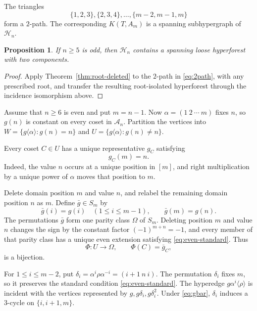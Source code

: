 \documentclass[4pt]{article} %
\newtheorem{proposition}[theorem]{Proposition}
\newcommand{\la}{\langle}
\newcommand{\ra}{\rangle}
\begin{document}
The triangles
\begin{equation}\label{eq:2path}
 \{1,2,3\},\{2,3,4\},\ldots,\{m-2,m-1,m\}
\end{equation}
form a $2$-path. The corresponding $K(T,A_m)$ is a spanning subhypergraph
of $\mathcal H_n$.

\begin{proposition}\label{prop:odd-forest}
If $n\geq5$ is odd, then $\mathcal H_n$ contains a spanning loose
hyperforest with two components.
\end{proposition}

\begin{proof}
Apply Theorem~\ref{thm:root-deleted} to the $2$-path in
\eqref{eq:2path}, with any prescribed root, and transfer the resulting
root-isolated hyperforest through the incidence isomorphism above.
\end{proof}

Assume that $n\geq6$ is even and put $m=n-1$. Now
$\alpha=(1\ 2\ \cdots\ m)$ fixes $n$, so $g(n)$ is constant on every
coset in $\mathcal A_n$. Partition the vertices into
$
 W=\{g\la\alpha\ra:g(n)=n\}$ and $
 U=\{g\la\alpha\ra:g(n)\neq n\}.
$

Every coset $C\in U$ has a unique representative $g_C$ satisfying
\begin{equation}\label{eq:even-standard}
 g_C(m)=n.
\end{equation}
Indeed, the value $n$ occurs at a unique position in $[m]$, and right
multiplication by a unique power of $\alpha$ moves that position to $m$.

Delete domain position $m$ and value $n$, and relabel the remaining domain
position $n$ as $m$. Define $\bar g\in S_m$ by
\begin{equation}\label{eq:gbar}
 \bar g(i)=g(i)\quad(1\leq i\leq m-1),\qquad
 \bar g(m)=g(n).
\end{equation}
The permutations $\bar g$ form one parity class $\Omega$ of $S_m$. Deleting
position $m$ and value $n$ changes the sign by the constant factor
$(-1)^{m+n}=-1$, and every member of that parity class has a unique even
extension satisfying \eqref{eq:even-standard}. Thus
\begin{equation}\label{eq:even-vertex-map}
 \Phi:U\longrightarrow\Omega,\qquad
 \Phi(C)=\bar g_C,
\end{equation}
is a bijection.

For $1\leq i\leq m-2$, put
$
 \delta_i=\alpha^i\rho\alpha^{-i}=(i+1\ n\ i).
$
The permutation $\delta_i$ fixes $m$, so it preserves the standard
condition \eqref{eq:even-standard}. The hyperedge
$g\alpha^i\la\rho\ra$ is incident with the vertices represented by
$g,g\delta_i,g\delta_i^2$. Under \eqref{eq:gbar}, $\delta_i$ induces a
$3$-cycle on $\{i,i+1,m\}$.
\end{document}
